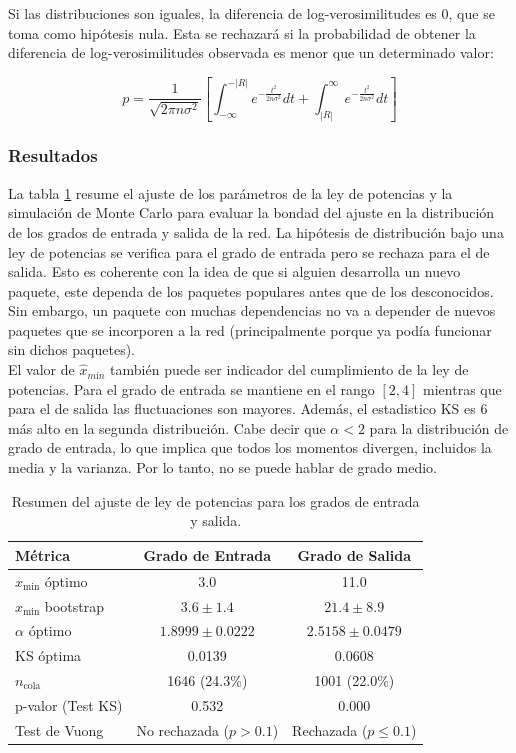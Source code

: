 \documentclass[12pt,a4paper]{report}
\begin{document}
	Si las distribuciones son iguales, la diferencia de log-verosimilitudes es 0, que se toma como hipótesis nula. Esta se rechazará si la probabilidad de obtener la diferencia de log-verosimilitudes observada es menor que un determinado valor:
	
	\begin{equation}
	p = \frac{1}{\sqrt{2\pi n \sigma^2}}\left[\int_{-\infty}^{-|R|}e^{-\frac{t^2}{2n\sigma^2}} dt + \int_{|R|}^{\infty}e^{-\frac{t^2}{2n\sigma^2}} dt\right]
	\end{equation}
	
	\subsubsection{Resultados}
	La tabla \ref{tab:res_dgrado} resume el ajuste de los parámetros de la ley de potencias y la simulación de Monte Carlo para evaluar la bondad del ajuste en la distribución de los grados de entrada y salida de la red. La hipótesis de distribución bajo una ley de potencias se verifica para el grado de entrada pero se rechaza para el de salida. Esto es coherente con la idea de que si alguien desarrolla un nuevo paquete, este dependa de los paquetes populares antes que de los desconocidos. Sin embargo, un paquete con muchas dependencias no va a depender de nuevos paquetes que se incorporen a la red (principalmente porque ya podía funcionar sin dichos paquetes). \\
	
	El valor de $\hat{x}_{mín}$ también puede ser indicador del cumplimiento de la ley de potencias. Para el grado de entrada se mantiene en el rango $[2, 4]$ mientras que para el de salida las fluctuaciones son mayores. Además, el estadistico KS es 6 más alto en la segunda distribución. Cabe decir que $\alpha < 2$ para la distribución de grado de entrada, lo que implica que todos los momentos divergen, incluidos la media y la varianza. Por lo tanto, no se puede hablar de grado medio.
	
	\begin{table}[H]
		\centering
		\begin{tabular}{lcc}
			\toprule
			\textbf{Métrica} & \textbf{Grado de Entrada} & \textbf{Grado de Salida} \\
			\midrule
			$x_{\min}$ óptimo & 3.0 & 11.0 \\
			$x_{\min}$ bootstrap & $3.6 \pm 1.4$ & $21.4 \pm 8.9$ \\
			$\alpha$ óptimo & $1.8999 \pm 0.0222$ & $2.5158 \pm 0.0479$ \\
			KS óptima & 0.0139 & 0.0608 \\
			$n_{\text{cola}}$ & 1646 (24.3\%) & 1001 (22.0\%) \\
			p-valor (Test KS) & 0.532 & 0.000 \\
			\midrule
			Test de Vuong & No rechazada ($p > 0.1$) & Rechazada ($p \le 0.1$) \\
			\bottomrule
		\end{tabular}
		\caption{Resumen del ajuste de ley de potencias para los grados de entrada y salida.}
		\label{tab:res_dgrado}
	\end{table}
	
\end{document}

